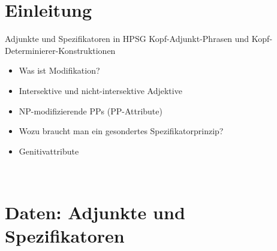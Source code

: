 \section{Einleitung}

\begin{frame}
  {Adjunkte und Spezifikatoren in HPSG}
  \onslide<+->
  \onslide<+->
  Kopf-Adjunkt-Phrasen und Kopf-Determinierer-Konstruktionen\\
  \Zeile
  \begin{itemize}[<+->]
    \item Was ist Modifikation?
    \item Intersektive und nicht-intersektive Adjektive
    \item NP-modifizierende PPs (PP-Attribute)
    \item Wozu braucht man ein gesondertes Spezifikatorprinzip?
    \item Genitivattribute
  \end{itemize}
  \Zeile
  \onslide<+->
  \centering 
  \\
\end{frame}

\section{Daten: Adjunkte und Spezifikatoren}

